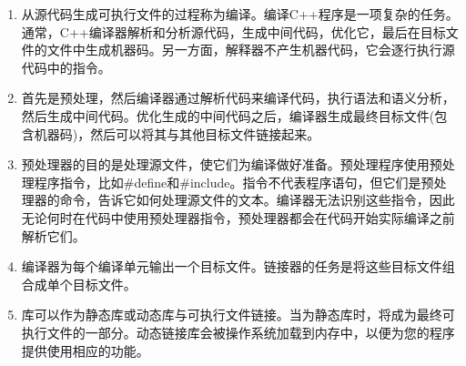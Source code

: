 \begin{enumerate}
	\item 从源代码生成可执行文件的过程称为编译。编译C++程序是一项复杂的任务。通常，C++编译器解析和分析源代码，生成中间代码，优化它，最后在目标文件的文件中生成机器码。另一方面，解释器不产生机器代码，它会逐行执行源代码中的指令。
	\item 首先是预处理，然后编译器通过解析代码来编译代码，执行语法和语义分析，然后生成中间代码。优化生成的中间代码之后，编译器生成最终目标文件(包含机器码)，然后可以将其与其他目标文件链接起来。
	\item 预处理器的目的是处理源文件，使它们为编译做好准备。预处理程序使用预处理程序指令，比如\#define和\#include。指令不代表程序语句，但它们是预处理器的命令，告诉它如何处理源文件的文本。编译器无法识别这些指令，因此无论何时在代码中使用预处理器指令，预处理器都会在代码开始实际编译之前解析它们。
	\item 编译器为每个编译单元输出一个目标文件。链接器的任务是将这些目标文件组合成单个目标文件。
	\item 库可以作为静态库或动态库与可执行文件链接。当为静态库时，将成为最终可执行文件的一部分。动态链接库会被操作系统加载到内存中，以便为您的程序提供使用相应的功能。
\end{enumerate}